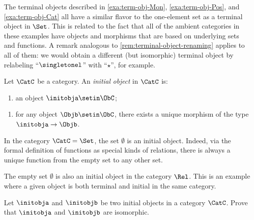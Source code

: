\begin{remark}
The terminal objects described in \cref{exa:term-obj-Mon}, \cref{exa:term-obj-Pos}, and \cref{exa:term-obj-Cat} all have a similar flavor to the one-element set as a terminal object in $\Set$. This is related to the fact that all of the ambient categories in these examples have objects and morphisms that are based on underlying sets and functions. A remark analogous to \cref{rem:terminal-object-renaming} applies to all of them: we would obtain a different (but isomorphic) terminal object by relabeling ``$\singletonel$'' with ``$\star$'', for example. 
\end{remark}



\begin{ctdefinition}\label{def:initial-object}
Let $\CatC$ be a category. An \emph{initial object} in $\CatC$ is: 

\constit
\begin{enumerate}
\item an object $\initobja \setin \ObC$; 
\end{enumerate}
\condit
\begin{enumerate}
\item for any object $\Objb \setin \ObC$, there exists a unique morphism of the type $\initobja \to \Objb$. 
\end{enumerate}
\end{ctdefinition}

\begin{example}
In the category $\CatC = \Set$, the set $\emptyset$ is an initial object. Indeed, via the formal definition of functions as special kinds of relations, there is always a unique function from the empty set to any other set. 
\end{example}

\begin{example}\label{exa:init-obj-Rel}
The empty set $\emptyset$ is also an initial object in the category $\Rel$. This is an example where a given object is both terminal and initial in the same category. 
\end{example}



\begin{gradedexercise}
Let $\initobja$ and $\initobjb$ be two initial objects in a category $\CatC$.  Prove that $\initobja$ and $\initobjb$ are isomorphic.  
\end{gradedexercise}


